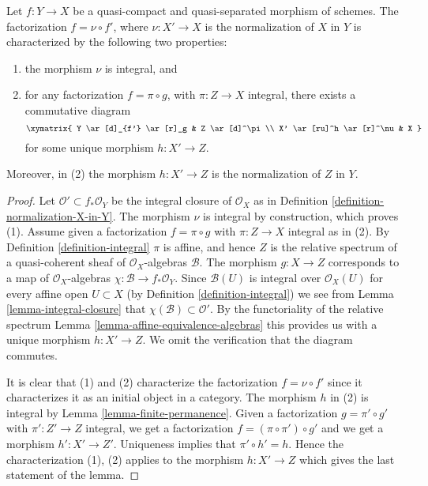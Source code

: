 \begin{lemma}
\label{lemma-characterize-normalization}
Let $f : Y \to X$ be a quasi-compact and quasi-separated morphism of schemes.
The factorization $f = \nu \circ f'$, where $\nu : X' \to X$ is the
normalization of $X$ in $Y$ is characterized by the following
two properties:
\begin{enumerate}
\item the morphism $\nu$ is integral, and
\item for any factorization $f = \pi \circ g$, with $\pi : Z \to X$
integral, there exists a commutative diagram
$$
\xymatrix{
Y \ar[d]_{f'} \ar[r]_g & Z \ar[d]^\pi \\
X' \ar[ru]^h \ar[r]^\nu & X
}
$$
for some unique morphism $h : X' \to Z$.
\end{enumerate}
Moreover, in (2) the morphism $h : X' \to Z$ is the normalization of
$Z$ in $Y$.
\end{lemma}

\begin{proof}
Let $\mathcal{O}' \subset f_*\mathcal{O}_Y$ be the integral closure of
$\mathcal{O}_X$ as in Definition \ref{definition-normalization-X-in-Y}.
The morphism $\nu$ is integral by construction, which proves (1).
Assume given a factorization $f = \pi \circ g$ with $\pi : Z \to X$
integral as in (2). By Definition \ref{definition-integral}
$\pi$ is affine, and hence $Z$ is the relative
spectrum of a quasi-coherent sheaf of $\mathcal{O}_X$-algebras $\mathcal{B}$.
The morphism $g : X \to Z$ corresponds to a map of $\mathcal{O}_X$-algebras
$\chi : \mathcal{B} \to f_*\mathcal{O}_Y$. Since $\mathcal{B}(U)$ is
integral over $\mathcal{O}_X(U)$ for every affine open $U \subset X$
(by Definition \ref{definition-integral})
we see from Lemma \ref{lemma-integral-closure}
that $\chi(\mathcal{B}) \subset \mathcal{O}'$.
By the functoriality of the relative spectrum
Lemma \ref{lemma-affine-equivalence-algebras}
this provides us with a unique morphism
$h : X' \to Z$. We omit the verification that the diagram commutes.

\medskip\noindent
It is clear that (1) and (2) characterize the
factorization $f = \nu \circ f'$ since it characterizes it
as an initial object in a category. The morphism $h$ in (2)
is integral by Lemma \ref{lemma-finite-permanence}.
Given a factorization $g = \pi' \circ g'$ with $\pi' : Z' \to Z$
integral, we get a factorization $f = (\pi \circ \pi') \circ g'$ and
we get a morphism $h' : X' \to Z'$. Uniqueness implies that
$\pi' \circ h' = h$. Hence the characterization (1), (2) applies
to the morphism $h : X' \to Z$ which gives the last statement of the lemma.
\end{proof}


